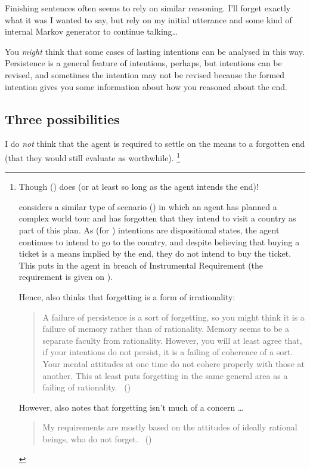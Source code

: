 \documentclass[10pt]{article}
\newcommand{\hozline}[0]{%
  \noindent\hdashrule[0.5ex][c]{\textwidth}{.1pt}{}
}
\begin{document}
Finishing sentences often seems to rely on similar reasoning.
I'll forget exactly what it was I wanted to say, but rely on my initial utterance and some kind of internal Markov generator to continue talking\dots

You \emph{might} think that some cases of lasting intentions can be analysed in this way.
Persistence is a general feature of intentions, perhaps, but intentions can be revised, and sometimes the intention may not be revised because the formed intention gives you some information about how you reasoned about the end.


\newpage

\subsection*{Three possibilities}
\label{sec:three-possibilities}

\hozline

I do \emph{not} think that the agent is required to settle on the means to a forgotten end (that they would still evaluate as worthwhile).\nolinebreak
\footnote{\label{footnote:broome}
  Though \citeauthor{Broome:2013aa} (\citeyear{Broome:2013aa}) does (or at least so long as the agent intends the end)!

  \citeauthor{Broome:2013aa} considers a similar type of scenario (\citeyear[165]{Broome:2013aa}) in which an agent has planned a complex world tour and has forgotten that they intend to visit a country as part of this plan.
  As (for \citeauthor{Broome:2013aa}) intentions are dispositional states, the agent continues to intend to go to the country, and despite believing that buying a ticket is a means implied by the end, they do not intend to buy the ticket.
  This puts in the agent in breach of \citeauthor{Broome:2013aa} Instrumental Requirement (the requirement is given on \citeyear[159]{Broome:2013aa}).

  Hence, \citeauthor{Broome:2013aa} also thinks that forgetting is a form of irrationality:
  \begin{quote}
    A failure of persistence is a sort of forgetting, so you might think it is a failure of memory rather than of rationality. Memory seems to be a separate faculty from rationality. However, you will at least agree that, if your intentions do not persist, it is a failing of coherence of a sort. Your mental attitudes at one time do not cohere properly with those at another. This at least puts forgetting in the same general area as a failing of rationality.\nolinebreak
    \mbox{ }\hfill\mbox{(\citeyear[177]{Broome:2013aa})}
  \end{quote}
  However, \citeauthor{Broome:2013aa} also notes that forgetting isn't much of a concern \dots
  \begin{quote}
    My requirements are mostly based on the attitudes of ideally rational beings, who do not forget.\nolinebreak
    \mbox{ }\hfill\mbox{(\citeyear[181]{Broome:2013aa})}
  \end{quote}
}
\end{document}
